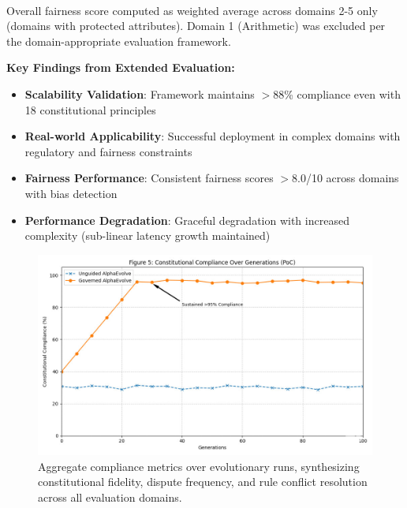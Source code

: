 \documentclass[manuscript,screen,review,anonymous,9pt]{acmart}
\begin{document}
\begin{table}[htbp]
	\begin{minipage}{\linewidth}\footnotesize \textsuperscript{\dag}Overall fairness score computed as weighted average across domains 2-5 only (domains with protected attributes). Domain 1 (Arithmetic) was excluded per the domain-appropriate evaluation framework.\end{minipage}
\end{table}

\textbf{Key Findings from Extended Evaluation:}
\begin{itemize}
	\item \textbf{Scalability Validation}: Framework maintains $>$88\% compliance even with 18 constitutional principles
	\item \textbf{Real-world Applicability}: Successful deployment in complex domains with regulatory and fairness constraints
	\item \textbf{Fairness Performance}: Consistent fairness scores $>$8.0/10 across domains with bias detection
	\item \textbf{Performance Degradation}: Graceful degradation with increased complexity (sub-linear latency growth maintained)
\end{itemize}

\begin{figure}[htbp]
	\centering
	\includegraphics[width=\linewidth,keepaspectratio]{Figure_5_compliance_generations.png}
	\caption{Aggregate compliance metrics over evolutionary runs, synthesizing constitutional fidelity, dispute frequency, and rule conflict resolution across all evaluation domains.}
	\label{fig:compliance-trends}
\end{figure}
\end{document}
